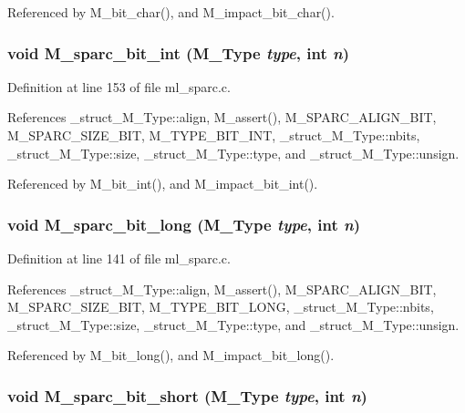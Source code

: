 Referenced by M\_\-bit\_\-char(), and M\_\-impact\_\-bit\_\-char().
\subsubsection{\setlength{\rightskip}{0pt plus 5cm}void M\_\-sparc\_\-bit\_\-int (\bf{M\_\-Type} {\em type}, int {\em n})}\label{m__sparc_8h_9be4072680fa6e9bcc6e78e8e7f49023}




Definition at line 153 of file ml\_\-sparc.c.

References \_\-struct\_\-M\_\-Type::align, M\_\-assert(), M\_\-SPARC\_\-ALIGN\_\-BIT, M\_\-SPARC\_\-SIZE\_\-BIT, M\_\-TYPE\_\-BIT\_\-INT, \_\-struct\_\-M\_\-Type::nbits, \_\-struct\_\-M\_\-Type::size, \_\-struct\_\-M\_\-Type::type, and \_\-struct\_\-M\_\-Type::unsign.

Referenced by M\_\-bit\_\-int(), and M\_\-impact\_\-bit\_\-int().
\subsubsection{\setlength{\rightskip}{0pt plus 5cm}void M\_\-sparc\_\-bit\_\-long (\bf{M\_\-Type} {\em type}, int {\em n})}\label{m__sparc_8h_bea824f22e6293c632bf11d5f106cb3c}




Definition at line 141 of file ml\_\-sparc.c.

References \_\-struct\_\-M\_\-Type::align, M\_\-assert(), M\_\-SPARC\_\-ALIGN\_\-BIT, M\_\-SPARC\_\-SIZE\_\-BIT, M\_\-TYPE\_\-BIT\_\-LONG, \_\-struct\_\-M\_\-Type::nbits, \_\-struct\_\-M\_\-Type::size, \_\-struct\_\-M\_\-Type::type, and \_\-struct\_\-M\_\-Type::unsign.

Referenced by M\_\-bit\_\-long(), and M\_\-impact\_\-bit\_\-long().
\subsubsection{\setlength{\rightskip}{0pt plus 5cm}void M\_\-sparc\_\-bit\_\-short (\bf{M\_\-Type} {\em type}, int {\em n})}\label{m__sparc_8h_77961261fa57e30daba61921c5552cda}




